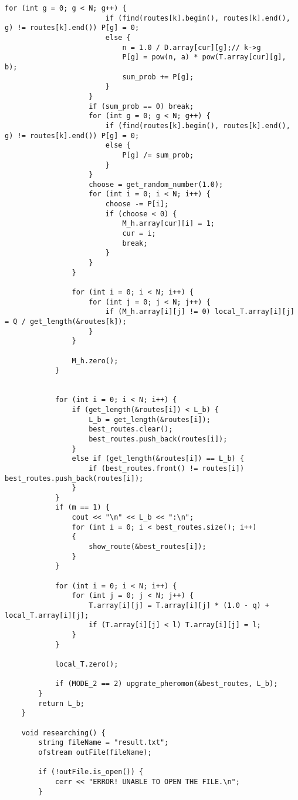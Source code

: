 \begin{lstlisting}[label = list1, caption = Программная реализация алгоритма и всех вспомогательных функций]
					for (int g = 0; g < N; g++) {
						if (find(routes[k].begin(), routes[k].end(), g) != routes[k].end()) P[g] = 0;
						else {
							n = 1.0 / D.array[cur][g];// k->g
							P[g] = pow(n, a) * pow(T.array[cur][g], b);
							sum_prob += P[g];
						}
					}
					if (sum_prob == 0) break;
					for (int g = 0; g < N; g++) {
						if (find(routes[k].begin(), routes[k].end(), g) != routes[k].end()) P[g] = 0;
						else {
							P[g] /= sum_prob;
						}
					}
					choose = get_random_number(1.0);
					for (int i = 0; i < N; i++) {
						choose -= P[i];
						if (choose < 0) {
							M_h.array[cur][i] = 1;
							cur = i;
							break;
						}
					}
				}

				for (int i = 0; i < N; i++) {
					for (int j = 0; j < N; j++) {
						if (M_h.array[i][j] != 0) local_T.array[i][j] = Q / get_length(&routes[k]);
					}
				}
				
				M_h.zero();
			}
			

			for (int i = 0; i < N; i++) {
				if (get_length(&routes[i]) < L_b) {
					L_b = get_length(&routes[i]);
					best_routes.clear();
					best_routes.push_back(routes[i]);
				}
				else if (get_length(&routes[i]) == L_b) {
					if (best_routes.front() != routes[i]) best_routes.push_back(routes[i]);
				}
			}
			if (m == 1) {
				cout << "\n" << L_b << ":\n";
				for (int i = 0; i < best_routes.size(); i++)
				{
					show_route(&best_routes[i]);
				}
			}
			
			for (int i = 0; i < N; i++) {
				for (int j = 0; j < N; j++) {
					T.array[i][j] = T.array[i][j] * (1.0 - q) + local_T.array[i][j];
					if (T.array[i][j] < l) T.array[i][j] = l;
				}
			}

			local_T.zero();
			
			if (MODE_2 == 2) upgrate_pheromon(&best_routes, L_b);
		}
		return L_b;
	}
	
	void researching() {
		string fileName = "result.txt";
		ofstream outFile(fileName);
		
		if (!outFile.is_open()) {
			cerr << "ERROR! UNABLE TO OPEN THE FILE.\n";
		}
		

\end{lstlisting}
